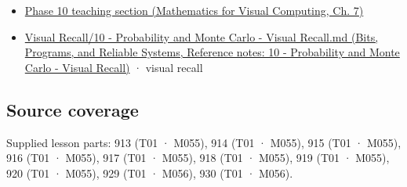 \begin{itemize}
\tightlist
\item
  \href{../02-Mathematics-for-Visual-Computing/main.pdf\#nameddest=02-foundations-ii-ch023-expected-values-describe-centers-covariance-describes-dependence}{Phase 10 teaching section (Mathematics for Visual Computing, Ch. 7)}
\item
  \href{../01-Bits-Programs-and-Reliable-Systems/main.pdf\#nameddest=appendix-cb5af353ef77}{Visual Recall/10 - Probability and Monte Carlo - Visual Recall.md (Bits, Programs, and Reliable Systems, Reference notes: 10 - Probability and Monte Carlo - Visual Recall)} · visual recall
\end{itemize}

\subsection{Source coverage}\label{appendix-54c383df9992-source-coverage}

Supplied lesson parts: 913 (T01 · M055), 914 (T01 · M055), 915 (T01 · M055), 916 (T01 · M055), 917 (T01 · M055), 918 (T01 · M055), 919 (T01 · M055), 920 (T01 · M055), 929 (T01 · M056), 930 (T01 · M056).

